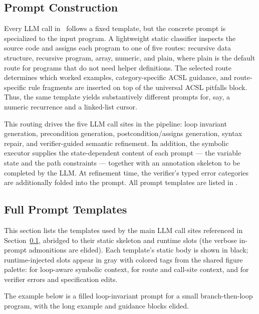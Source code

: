 \subsection{Prompt Construction}
\label{sec:prompt}

\noindent
Every LLM call in \toolname\ follows a fixed template, but the concrete prompt is specialized to the input program. A lightweight static classifier inspects the source code and assigns each program to one of five routes: recursive data structure, recursive program, array, numeric, and plain, where plain is the default route for programs that do not need helper definitions. The selected route determines which worked examples, category-specific ACSL guidance, and route-specific rule fragments are inserted on top of the universal ACSL pitfalls block. Thus, the same template yields substantively different prompts for, say, a numeric recurrence and a linked-list cursor.

This routing drives the five LLM call sites in the pipeline: loop invariant generation, precondition generation, postcondition/assigns generation, syntax repair, and verifier-guided semantic refinement. In addition, the symbolic executor supplies the state-dependent content of each prompt --- the variable state and the path constraints --- together with an annotation skeleton to be completed by the LLM. At refinement time, the verifier's typed error categories are additionally folded into the prompt. All prompt templates are listed in .

\subsection{Full Prompt Templates}
\label{app:prompts}

This section lists the templates used by the main LLM call sites referenced in Section~\ref{sec:prompt}, abridged to their static skeleton and runtime slots (the verbose in-prompt admonitions are elided). Each template's static body is shown in black; runtime-injected slots appear in gray with colored tags from the shared figure palette:  for loop-aware symbolic context,  for route and call-site context, and  for verifier errors and specification edits.



The example below is a filled loop-invariant prompt for a small branch-then-loop program, with the long example and guidance blocks elided.

